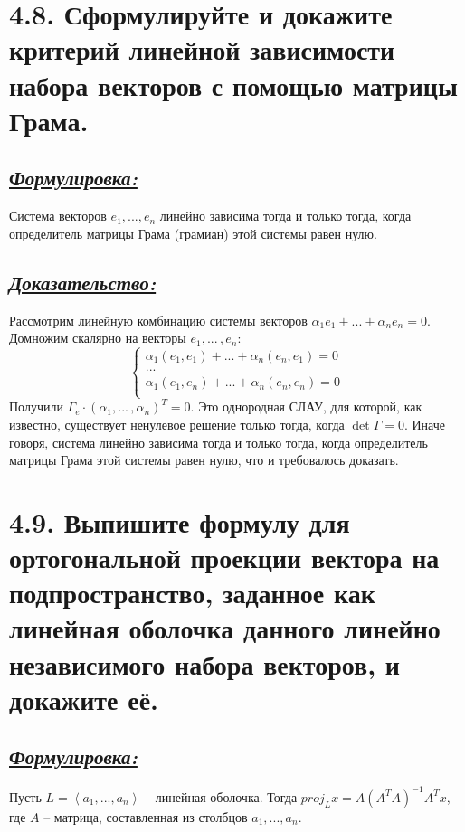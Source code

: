 \documentclass{article}
\begin{document}
\section*{\LARGE 4.8. Сформулируйте и докажите критерий линейной зависимости набора векторов с помощью матрицы Грама. }
\subsection*{\Large \underline{\textit{Формулировка: }}}
Система векторов $e_1, ... , e_n$ линейно зависима тогда и только тогда, когда определитель матрицы Грама (грамиан) этой системы равен нулю. 

\subsection*{\Large \underline{\textit{Доказательство: }}}
Рассмотрим линейную комбинацию системы векторов $\alpha_1e_1 + ... + \alpha_ne_n = 0$. Домножим скалярно на векторы $e_1, ...\,, e_n$:
$$
\begin{cases}
\alpha_1(e_1, e_1) + ... + \alpha_n(e_n, e_1) = 0 \\
... \\
\alpha_1(e_1, e_n) + ... + \alpha_n(e_n, e_n) = 0 \\
\end{cases}
$$
Получили $\Gamma_e\cdot(\alpha_1, ...\,, \alpha_n)^T = 0$. Это однородная СЛАУ, для которой, как известно, существует ненулевое решение только тогда, когда $\det{\Gamma} = 0$. Иначе говоря, система линейно зависима тогда и только тогда, когда определитель матрицы Грама этой системы равен нулю, что и требовалось доказать.

\section*{\LARGE 4.9. Выпишите формулу для ортогональной проекции вектора на подпространство, заданное как линейная оболочка данного линейно независимого набора векторов, и докажите её.  }
\subsection*{\Large \underline{\textit{Формулировка: }}}
Пусть $L = \left< a_1, ... , a_n \right>$ -- линейная оболочка. Тогда $proj_L x = A(A^T A)^{-1}A^T x$, где $A$ -- матрица, составленная из столбцов $a_1, ... , a_n$.
\end{document}
